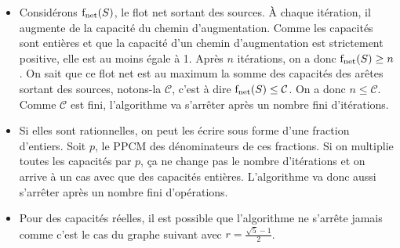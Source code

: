 \begin{solution}
  \begin{itemize}
    \item
      Considérons $\operatorname{f_\mathrm{net}}(S)$, le flot net sortant des sources.
      À chaque itération, il augmente de la capacité du chemin d'augmentation.
      Comme les capacités sont entières et que la capacité d'un chemin d'augmentation est strictement positive,
      elle est au moins égale à 1.
      Après $n$ itérations, on a donc $\operatorname{f_\mathrm{net}}(S) \geq n$.
      On sait que ce flot net est au maximum la somme des capacités des arêtes sortant des sources, notons-la $\mathcal{C}$,
      c'est à dire $\operatorname{f_\mathrm{net}}(S) \leq \mathcal{C}$.
      On a donc $n \leq \mathcal{C}$. Comme $\mathcal{C}$ est fini, l'algorithme va s'arrêter après un nombre fini d'itérations.
    \item
      Si elles sont rationnelles, on peut les écrire sous forme d'une fraction d'entiers.
      Soit $p$, le PPCM des dénominateurs de ces fractions.
      Si on multiplie toutes les capacités par $p$, ça ne change pas le nombre d'itérations
      et on arrive à un cas avec que des capacités entières.
      L'algorithme va donc aussi s'arrêter après un nombre fini d'opérations.
    \item
      Pour des capacités réelles, il est possible que l'algorithme ne s'arrête jamais comme c'est le cas du
      graphe suivant avec $r = \frac{\sqrt{5} - 1}{2}$.
      \begin{center}
      \end{center}


\end{itemize}
\end{solution}
